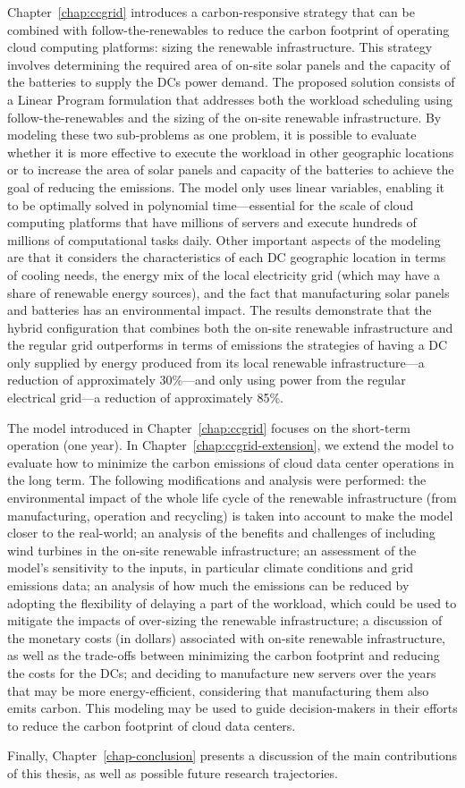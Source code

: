 Chapter~\ref{chap:ccgrid} introduces a carbon-responsive strategy that can be combined with follow-the-renewables to reduce the carbon footprint of operating cloud computing platforms: sizing the renewable infrastructure. This strategy involves determining the required area of on-site solar panels and the capacity of the batteries to supply the DCs power demand. The proposed solution consists of a Linear Program formulation that addresses both the workload scheduling using follow-the-renewables and the sizing of the on-site renewable infrastructure. By modeling these two sub-problems as one problem, it is possible to evaluate whether it is more effective to execute the workload in other geographic locations or to increase the area of solar panels and capacity of the batteries to achieve the goal of reducing the  emissions. The model only uses linear variables, enabling it to be optimally solved in polynomial time---essential for the scale of cloud computing platforms that have millions of servers and execute hundreds of millions of computational tasks daily. Other important aspects of the modeling are that it considers the characteristics of each DC geographic location in terms of cooling needs, the energy mix of the local electricity grid (which may have a share of renewable energy sources), and the fact that manufacturing solar panels and batteries has an environmental impact. The results demonstrate that the hybrid configuration that combines both the on-site renewable infrastructure and the regular grid outperforms in terms of  emissions the strategies of having a DC only supplied by energy produced from its local renewable infrastructure---a reduction of approximately 30\%---and only using power from the regular electrical grid---a reduction of approximately 85\%.


The model introduced in Chapter~\ref{chap:ccgrid} focuses on the short-term operation (one year). In Chapter~\ref{chap:ccgrid-extension}, we extend the model to evaluate how to minimize the carbon emissions of cloud data center operations in the long term. The following modifications and analysis were performed: the environmental impact of the whole life cycle of the renewable infrastructure (from manufacturing, operation and recycling) is taken into account to make the model closer to the real-world; an analysis of the benefits and challenges of including wind turbines in the on-site renewable infrastructure; an assessment of the model's sensitivity to the inputs, in particular climate conditions and grid emissions data; an analysis of how much the  emissions can be reduced by adopting the flexibility of delaying a part of the workload, which could be used to mitigate the impacts of over-sizing the renewable infrastructure; a discussion of the monetary costs (in dollars) associated with on-site renewable infrastructure, as well as the trade-offs between minimizing the carbon footprint and reducing the costs for the DCs; and deciding to manufacture new servers over the years that may be more energy-efficient, considering that manufacturing them also emits carbon. This modeling may be used to guide decision-makers in their efforts to reduce the carbon footprint of cloud data centers.

Finally, Chapter~\ref{chap-conclusion} presents a discussion of the main contributions of this thesis, as well as possible future research trajectories.